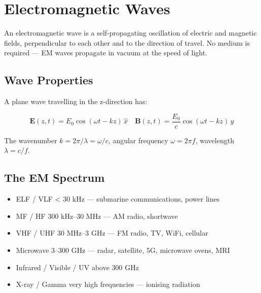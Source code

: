 \section{Electromagnetic Waves}\label{sec:wiki_em_waves}



An electromagnetic wave is a self-propagating oscillation of electric and magnetic fields, perpendicular to each other and to the direction of travel. No medium is required — EM waves propagate in vacuum at the speed of light.

				

\subsection{Wave Properties}

				

A plane wave travelling in the z-direction has:


				
\[\mathbf{E}(z,t) = E_0 \cos(\omega t - kz)\,\hat{x}\quad\mathbf{B}(z,t) = \frac{E_0}{c}\cos(\omega t - kz)\,\hat{y}\]

				

The wavenumber $k = 2\pi/\lambda = \omega/c$, angular frequency $\omega = 2\pi f$, wavelength $\lambda = c/f$.

				

\subsection{The EM Spectrum}

				


				
\begin{itemize}

					\item ELF / VLF \textless{} 30 kHz — submarine communications, power lines

					\item MF / HF 300 kHz–30 MHz — AM radio, shortwave

					\item VHF / UHF 30 MHz–3 GHz — FM radio, TV, WiFi, cellular

					\item Microwave 3–300 GHz — radar, satellite, 5G, microwave ovens, MRI

					\item Infrared / Visible / UV above 300 GHz

					\item X-ray / Gamma very high frequencies — ionising radiation

				
\end{itemize}

